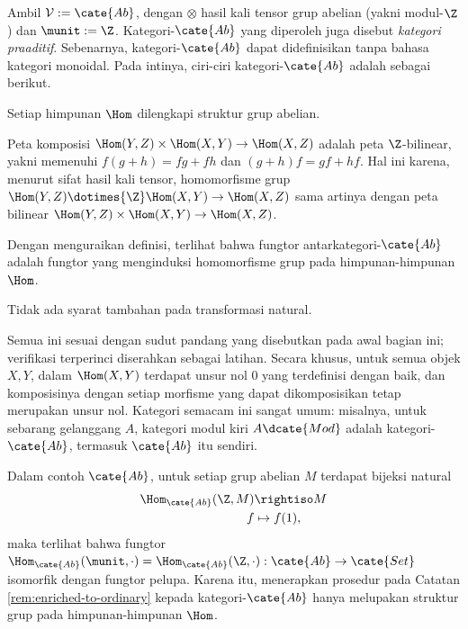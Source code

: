 \begin{example}\label{eg:Ab-cat}
	Ambil $\mathcal{V} := \cate{Ab}$, dengan $\otimes$ hasil kali tensor grup abelian (yakni modul-$\Z$) dan $\munit := \Z$. Kategori-$\cate{Ab}$ yang diperoleh juga disebut \emph{kategori praaditif}. Sebenarnya, kategori-$\cate{Ab}$ dapat didefinisikan tanpa bahasa kategori monoidal. Pada intinya, ciri-ciri kategori-$\cate{Ab}$ adalah sebagai berikut.
	\begin{compactitem}
		\item Setiap himpunan $\Hom$ dilengkapi struktur grup abelian.
		\item Peta komposisi $\Hom(Y, Z) \times \Hom(X, Y) \to \Hom(X, Z)$ adalah peta $\Z$-bilinear, yakni memenuhi $f(g+h) = fg+ fh$ dan $(g+h)f = gf + hf$. Hal ini karena, menurut sifat hasil kali tensor, homomorfisme grup $\Hom(Y,Z) \dotimes{\Z} \Hom(X, Y) \to \Hom(X, Z)$ sama artinya dengan peta bilinear $\Hom(Y, Z) \times \Hom(X, Y) \to \Hom(X, Z)$.
		\item Dengan menguraikan definisi, terlihat bahwa fungtor antarkategori-$\cate{Ab}$ adalah fungtor yang menginduksi homomorfisme grup pada himpunan-himpunan $\Hom$.
		\item Tidak ada syarat tambahan pada transformasi natural.
	\end{compactitem}
	 Semua ini sesuai dengan sudut pandang yang disebutkan pada awal bagian ini; verifikasi terperinci diserahkan sebagai latihan. Secara khusus, untuk semua objek $X, Y$, dalam $\Hom(X, Y)$ terdapat unsur nol $0$ yang terdefinisi dengan baik, dan komposisinya dengan setiap morfisme yang dapat dikomposisikan tetap merupakan unsur nol. Kategori semacam ini sangat umum: misalnya, untuk sebarang gelanggang $A$, kategori modul kiri $A\dcate{Mod}$ adalah kategori-$\cate{Ab}$, termasuk $\cate{Ab}$ itu sendiri.

	Dalam contoh $\cate{Ab}$, untuk setiap grup abelian $M$ terdapat bijeksi natural
	\begin{align*}
		\Hom_{\cate{Ab}}(\Z, M) & \rightiso M \\
		f & \mapsto f(1),
	\end{align*}
	maka terlihat bahwa fungtor $\Hom_{\cate{Ab}}(\munit, \cdot) = \Hom_{\cate{Ab}}(\Z, \cdot): \cate{Ab} \to \cate{Set}$ isomorfik dengan fungtor pelupa. Karena itu, menerapkan prosedur pada Catatan \ref{rem:enriched-to-ordinary} kepada kategori-$\cate{Ab}$ hanya melupakan struktur grup pada himpunan-himpunan $\Hom$.
\end{example}

